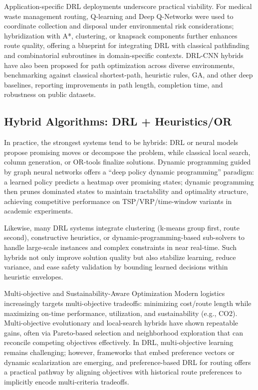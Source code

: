 Application-specific DRL deployments underscore practical viability. For medical waste management routing, Q-learning and Deep Q-Networks were used to coordinate collection and disposal under environmental risk considerations; hybridization with A*, clustering, or knapsack components further enhances route quality, offering a blueprint for integrating DRL with classical pathfinding and combinatorial subroutines in domain-specific contexts. DRL-CNN hybrids have also been proposed for path optimization across diverse environments, benchmarking against classical shortest-path, heuristic rules, GA, and other deep baselines, reporting improvements in path length, completion time, and robustness on public datasets.​

\subsection{Hybrid Algorithms: DRL + Heuristics/OR}
In practice, the strongest systems tend to be hybrids: DRL or neural models propose promising moves or decompose the problem, while classical local search, column generation, or OR-tools finalize solutions. Dynamic programming guided by graph neural networks offers a “deep policy dynamic programming” paradigm: a learned policy predicts a heatmap over promising states; dynamic programming then prunes dominated states to maintain tractability and optimality structure, achieving competitive performance on TSP/VRP/time-window variants in academic experiments.​

Likewise, many DRL systems integrate clustering (k-means group first, route second), constructive heuristics, or dynamic-programming-based sub-solvers to handle large-scale instances and complex constraints in near real-time. Such hybrids not only improve solution quality but also stabilize learning, reduce variance, and ease safety validation by bounding learned decisions within heuristic envelopes.

Multi-objective and Sustainability-Aware Optimization
Modern logistics increasingly targets multi-objective tradeoffs: minimizing cost/route length while maximizing on-time performance, utilization, and sustainability (e.g., CO2). Multi-objective evolutionary and local-search hybrids have shown repeatable gains, often via Pareto-based selection and neighborhood exploration that can reconcile competing objectives effectively. In DRL, multi-objective learning remains challenging; however, frameworks that embed preference vectors or dynamic scalarization are emerging, and preference-based DRL for routing offers a practical pathway by aligning objectives with historical route preferences to implicitly encode multi-criteria tradeoffs.​

